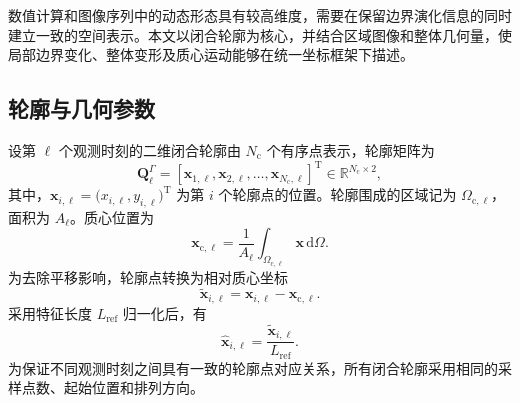 数值计算和图像序列中的动态形态具有较高维度，需要在保留边界演化信息的同时建立一致的空间表示。本文以闭合轮廓为核心，并结合区域图像和整体几何量，使局部边界变化、整体变形及质心运动能够在统一坐标框架下描述。

\subsection{轮廓与几何参数}
\label{subsec:ch2_geometry}

设第 $\ell$ 个观测时刻的二维闭合轮廓由 $N_{\mathrm c}$ 个有序点表示，轮廓矩阵为
\begin{equation}
\boldsymbol{Q}_{\ell}^{\Gamma}
=
\left[
\boldsymbol{x}_{1,\ell},
\boldsymbol{x}_{2,\ell},
\ldots,
\boldsymbol{x}_{N_{\mathrm c},\ell}
\right]^{\mathrm T}
\in
\mathbb{R}^{N_{\mathrm c}\times2},
\label{eq:ch2_contour_matrix}
\end{equation}
其中，$\boldsymbol{x}_{i,\ell}=\bigl(x_{i,\ell},y_{i,\ell}\bigr)^{\mathrm T}$ 为第 $i$ 个轮廓点的位置。轮廓围成的区域记为 $\Omega_{\mathrm c,\ell}$，面积为 $A_{\ell}$。质心位置为
\begin{equation}
\boldsymbol{x}_{\mathrm c,\ell}
=
\frac{1}{A_{\ell}}
\int_{\Omega_{\mathrm c,\ell}}
\boldsymbol{x}\,\mathrm d\Omega.
\label{eq:ch2_centroid}
\end{equation}
为去除平移影响，轮廓点转换为相对质心坐标
\begin{equation}
\widetilde{\boldsymbol{x}}_{i,\ell}
=
\boldsymbol{x}_{i,\ell}
-
\boldsymbol{x}_{\mathrm c,\ell}.
\label{eq:ch2_centroid_alignment}
\end{equation}
采用特征长度 $L_{\mathrm{ref}}$ 归一化后，有
\begin{equation}
\widehat{\boldsymbol{x}}_{i,\ell}
=
\frac{\widetilde{\boldsymbol{x}}_{i,\ell}}
{L_{\mathrm{ref}}}.
\label{eq:ch2_contour_normalization}
\end{equation}
为保证不同观测时刻之间具有一致的轮廓点对应关系，所有闭合轮廓采用相同的采样点数、起始位置和排列方向。

